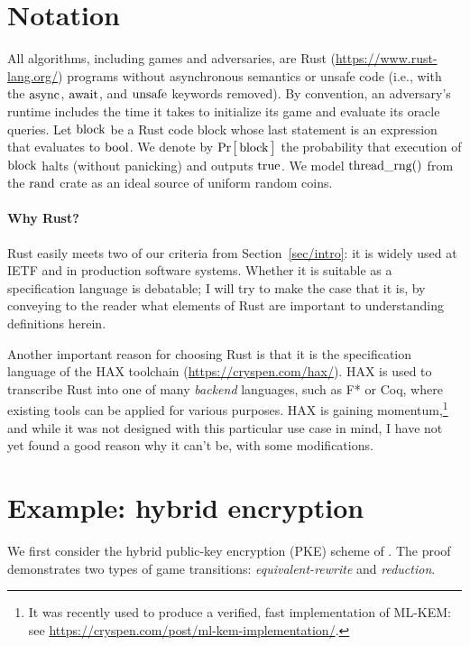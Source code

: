 \documentclass{article}
\newcommand{\Prob}[1]{\Pr\hspace{-1pt}\big[\,#1\,\big]}
\newcommand{\code}[1]{\textrm{\textup{\lstinline{#1}}}}
\begin{document}
\section{Notation}\label{sec/notation}

All algorithms, including games and adversaries, are Rust
(\url{https://www.rust-lang.org/}) programs without asynchronous semantics or unsafe code
(i.e., with the $\code{async}$, $\code{await}$, and $\code{unsafe}$ keywords
removed).
%
By convention, an adversary's runtime includes the time it takes to initialize
its game and evaluate its oracle queries.
%
Let $\code{block}$ be a Rust code block whose last statement is an expression
that evaluates to $\code{bool}$.
%
We denote by $\Prob{\code{block}}$ the probability that execution of
$\code{block}$ halts (without panicking) and outputs $\code{true}$.
%
We model
\href{https://rust-random.github.io/rand/rand/fn.thread_rng.html}{$\code{thread_rng()}$}
from the
\href{https://rust-random.github.io/rand/rand/index.html}{$\code{rand}$} crate
as an ideal source of uniform random coins.

\paragraph{Why Rust?}
%
Rust easily meets two of our criteria from Section~\ref{sec/intro}: it is
widely used at IETF and in production software systems.
%
Whether it is suitable as a specification language is debatable; I will try to
make the case that it is, by conveying to the reader what elements of Rust are
important to understanding definitions herein.

Another important reason for choosing Rust is that it is the specification
language of the HAX toolchain (\url{https://cryspen.com/hax/}).
%
HAX is used to transcribe Rust into one of many \emph{backend} languages, such
as F* or Coq, where existing tools can be applied for various purposes.
%
HAX is gaining momentum,\footnote{It was recently used to produce a verified,
fast implementation of ML-KEM: see
\url{https://cryspen.com/post/ml-kem-implementation/}.} and while it was not
designed with this particular use case in mind, I have not yet found a good
reason why it can't be, with some modifications.


\section{Example: hybrid encryption}\label{sec/hybrid}

We first consider the hybrid public-key encryption (PKE) scheme of
\cite[Chapter~15]{joy}.
%
The proof demonstrates two types of game transitions: \emph{equivalent-rewrite}
and \emph{reduction}.
\end{document}
